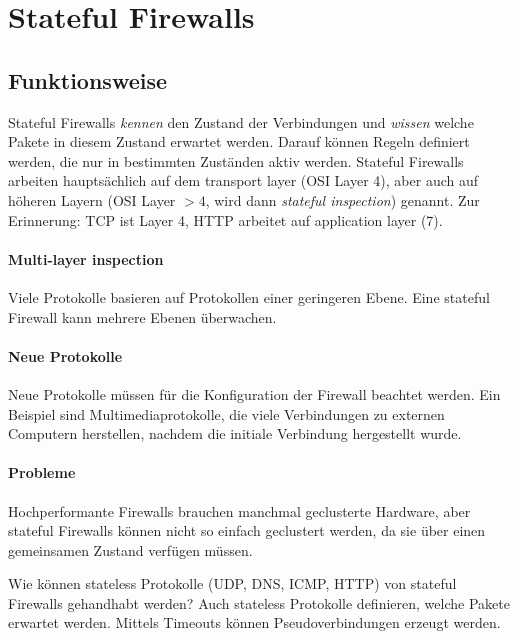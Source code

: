 \section{Stateful Firewalls}%
\label{sec:stateful_firewalls}

\subsection{Funktionsweise}%
\label{sub:funktionsweise}

Stateful Firewalls \emph{kennen} den Zustand der Verbindungen und \emph{wissen} welche
Pakete in diesem Zustand erwartet werden.
Darauf können Regeln definiert werden, die nur in bestimmten Zuständen aktiv werden.
Stateful Firewalls arbeiten hauptsächlich auf dem transport layer (OSI Layer 4), aber auch
auf höheren Layern (OSI Layer $> 4$, wird dann \emph{stateful inspection}) genannt.
Zur Erinnerung: TCP ist Layer 4, HTTP arbeitet auf application layer (7).

\paragraph{Multi-layer inspection}%

Viele Protokolle basieren auf Protokollen einer geringeren Ebene.
Eine stateful Firewall kann mehrere Ebenen überwachen.

\paragraph{Neue Protokolle}%

Neue Protokolle müssen für die Konfiguration der Firewall beachtet werden.
Ein Beispiel sind Multimediaprotokolle, die viele Verbindungen zu externen Computern
herstellen, nachdem die initiale Verbindung hergestellt wurde.

\paragraph{Probleme}%
\label{par:probleme}

Hochperformante Firewalls brauchen manchmal geclusterte Hardware, aber stateful Firewalls
können nicht so einfach geclustert werden, da sie über einen gemeinsamen Zustand verfügen
müssen.

Wie können stateless Protokolle (UDP, DNS, ICMP, HTTP) von stateful Firewalls
gehandhabt werden?
Auch stateless Protokolle definieren, welche Pakete erwartet werden.
Mittels Timeouts können Pseudoverbindungen erzeugt werden.
